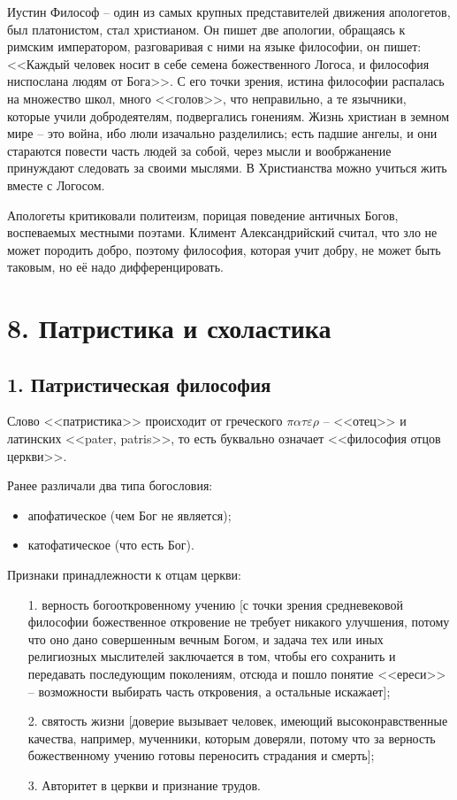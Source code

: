 \documentclass[a4paper, 12pt]{book} %
\begin{document}
Иустин Философ -- один из самых крупных представителей движения апологетов, был платонистом, стал христианом. Он пишет две апологии, обращаясь к римским императором, разговаривая с ними на языке философии, он пишет: <<Каждый человек носит в себе семена божественного Логоса, и философия ниспослана людям от Бога>>. С его точки зрения, истина философии распалась на множество школ, много <<голов>>, что неправильно, а те язычники, которые учили добродеятелям, подвергались гонениям. Жизнь христиан в земном мире -- это война, ибо люли изачально разделились; есть падшие ангелы, и они стараются повести часть людей за собой, через мысли и вообржанение принуждают следовать за своими мыслями. В Христианства можно учиться жить вместе с Логосом. 

Апологеты критиковали политеизм, порицая поведение античных Богов, воспеваемых местными поэтами. Климент Александрийский считал, что зло не может породить добро, поэтому философия, которая учит добру, не может быть таковым, но её надо дифференцировать.

\section*{8. Патристика и схоластика}

\subsection*{1. Патристическая философия}
Слово <<патристика>> происходит от греческого $\pi \alpha \tau \varepsilon \rho$ -- <<отец>> и латинских <<pater, patris>>, то есть буквально означает <<философия отцов церкви>>.

Ранее различали два типа богословия:
\begin{itemize}
\item апофатическое (чем Бог не является);
\item катофатическое (что есть Бог).
\end{itemize}

Признаки принадлежности к отцам церкви:
\begin{itemize}
\item[1.] верность богооткровенному учению [с точки зрения средневековой философии божественное откровение не требует никакого улучшения, потому что оно дано совершенным вечным Богом, и задача тех или иных религиозных мыслителей заключается в том, чтобы его сохранить и передавать последующим поколениям, отсюда и пошло понятие <<ереси>> -- возможности выбирать часть откровения, а остальные искажает];
\item[2.] святость жизни [доверие вызывает человек, имеющий высоконравственные качества, например, мученники, которым доверяли, потому что за верность божественному учению готовы переносить страдания и смерть];
\item[3.] Авторитет в церкви и признание трудов.
\end{itemize}  
\end{document}
